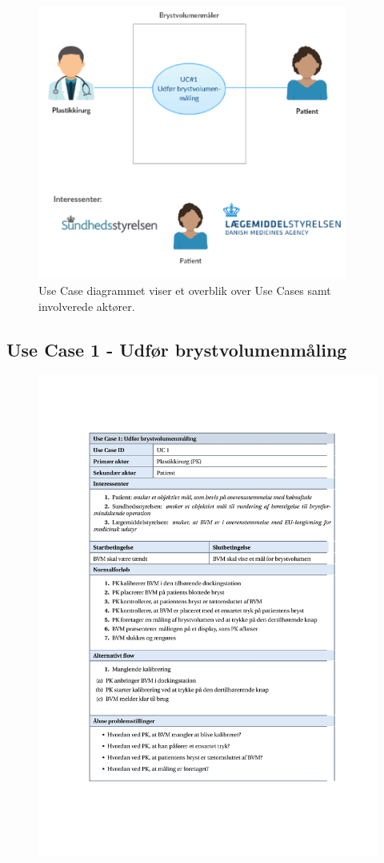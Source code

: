 			\begin{figure}[htb]
				\centering
					\includegraphics[width=4in]{UC1.png}
					\caption{Use Case diagrammet viser et overblik over Use Cases samt involverede aktører.}
					\label{fig:UC1}
			\end{figure}	 
	\pagebreak	
	\newpage	
  
  		\subsection{Use Case 1 - Udfør brystvolumenmåling}
  			
  			\begin{figure}[htb]
  				\flushleft
  					\includegraphics[width=6in]{UCtabel1}
  			\end{figure}
  			
